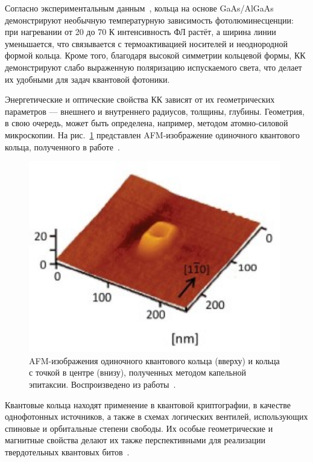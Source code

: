 \documentclass[14pt,oneside]{extarticle}
\begin{document}
Согласно экспериментальным данным~\cite{sibirmovskiy2018}, кольца на основе GaAs/AlGaAs демонстрируют необычную температурную зависимость фотолюминесценции: при нагревании от 20 до 70 К интенсивность ФЛ растёт, а ширина линии уменьшается, что связывается с термоактивацией носителей и неоднородной формой кольца. Кроме того, благодаря высокой симметрии кольцевой формы, КК демонстрируют слабо выраженную поляризацию испускаемого света, что делает их удобными для задач квантовой фотоники.

Энергетические и оптические свойства КК зависят от их геометрических параметров — внешнего и внутреннего радиусов, толщины, глубины. Геометрия, в свою очередь, может быть определена, например, методом атомно-силовой микроскопии. На рис.~\ref{fig:elborg2} представлен AFM-изображение одиночного квантового кольца, полученного в работе~\cite{elborg2017}.

\begin{figure}
    \begin{center}
        \includegraphics[width=11cm]{images/elborg_fig2.png}
        \caption{\label{fig:elborg2}
            AFM-изображения одиночного квантового кольца (вверху) и кольца с точкой в центре (внизу), полученных методом капельной эпитаксии. Воспроизведено из работы~\cite{elborg2017}.}
    \end{center}
\end{figure}

Квантовые кольца находят применение в квантовой криптографии, в качестве однофотонных источников, а также в схемах логических вентилей, использующих спиновые и орбитальные степени свободы. Их особые геометрические и магнитные свойства делают их также перспективными для реализации твердотельных квантовых битов~\cite{Liu2019}.
\end{document}

